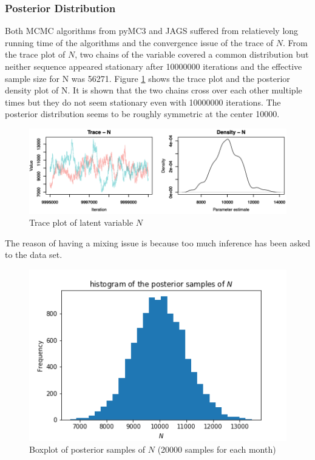 \documentclass[12pt]{article}
\begin{document}
{\subsubsection{Posterior Distribution}
Both MCMC algorithms from pyMC3 and JAGS suffered from relatievely long running time of the algorithms and the convergence issue of the trace of $N$. From the trace plot of $N$, two chains of the variable covered a common distribution but neither sequence appeared stationary after 10000000 iterations and the effective sample size for N was 56271. Figure \ref{trace_N} shows the trace plot and the posterior density plot of N. It is shown that the two chains cross over each other multiple times but they do not seem stationary even with 10000000 iterations. The posterior distribution seems to be roughly symmetric at the center 10000. 
\begin{figure}[h]
	\centering
	\includegraphics[width=1\linewidth]{Figures/not_mixed_N.png}
	\caption[Unobserved $N$: trace plot of latent variable $N$]{Trace plot of latent variable $N$}
	\label{trace_N}
\end{figure}

The reason of having a mixing issue is because too much inference has been asked to the data set. ~

\begin{figure}[h]
	\centering
	\includegraphics[width=0.7\linewidth]{Figures/hist_N.png}
	\caption[Unobserved $N$: boxplot of posterior samples of $N$]{Boxplot of posterior samples of $N$ (20000 samples for each month)}
	\label{hist_unk_n}
\end{figure}

}
\end{document}
